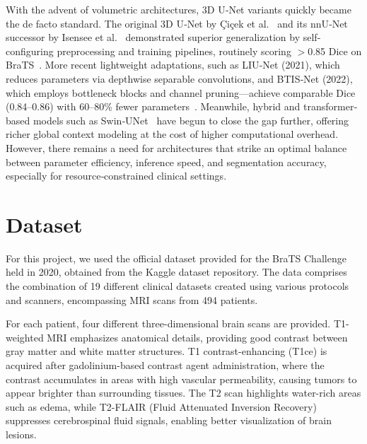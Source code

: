 \documentclass[10pt,twocolumn,letterpaper]{article}
\begin{document}
With the advent of volumetric architectures, 3D U‐Net variants quickly became the de facto standard. The original 3D U‐Net by Çiçek et al.~\cite{cicek20163dunetlearningdense} and its nnU‐Net successor by Isensee et al.~\cite{isensee2020nnunetbraintumorsegmentation} demonstrated superior generalization by self‐configuring preprocessing and training pipelines, routinely scoring $>$0.85 Dice on BraTS~\cite{dong2017automatic,bukhari2021e1d3,myronenko2019robust}. More recent lightweight adaptations, such as LIU‐Net (2021), which reduces parameters via depthwise separable convolutions, and BTIS‐Net (2022), which employs bottleneck blocks and channel pruning—achieve comparable Dice (0.84–0.86) with 60–80\% fewer parameters~\cite{Liu2024BTIS,Ahmad2025liu}. Meanwhile, hybrid and transformer‐based models such as Swin‐UNet~\cite{cao2021swinunetunetlikepuretransformer} have begun to close the gap further, offering richer global context modeling at the cost of higher computational overhead. However, there remains a need for architectures that strike an optimal balance between parameter efficiency, inference speed, and segmentation accuracy, especially for resource‐constrained clinical settings.


\section{Dataset}
For this project, we used the official dataset\cite{BraTSdataset} provided for the BraTS Challenge held in 2020, obtained from the Kaggle dataset repository. The data comprises the combination of 19 different clinical datasets created using various protocols and scanners, encompassing MRI scans from 494 patients.

For each patient, four different three-dimensional brain scans are provided. T1-weighted MRI emphasizes anatomical details, providing good contrast between gray matter and white matter structures. T1 contrast-enhancing (T1ce) is acquired after gadolinium-based contrast agent administration, where the contrast accumulates in areas with high vascular permeability, causing tumors to appear brighter than surrounding tissues. The T2 scan highlights water-rich areas such as edema, while T2-FLAIR (Fluid Attenuated Inversion Recovery) suppresses cerebrospinal fluid signals, enabling better visualization of brain lesions.
\end{document}
